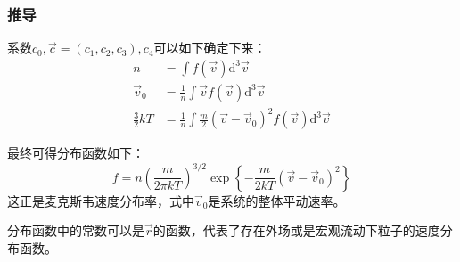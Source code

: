 \documentclass{if-beamer}
\begin{document}
\begin{frame}
    \frametitle{推导}
        \begin{block}{}
            系数$c_0,\vec{c}=(c_1,c_2,c_3),c_4$可以如下确定下来：
            \begin{equation*}
                \begin{aligned}
                n&=\int f(\vec{v}) \mathrm{d}^{3} \vec{v}\\ 
                \vec{v}_{0}&=\frac{1}{n} \int \vec{v} f(\vec{v}) \mathrm{d}^{3} \vec{v}\\ 
                \frac{3}{2} k T&=\frac{1}{n} \int \frac{m}{2}\left(\vec{v}-\vec{v}_{0}\right)^{2} f(\vec{v}) \mathrm{d}^{3} \vec{v}
                \end{aligned}
            \end{equation*}
        \end{block}
        \begin{block}{}
        最终可得分布函数如下：
        \begin{equation*}
            f=n\left(\frac{m}{2 \pi k T}\right)^{3 / 2} \exp \left\{-\frac{m}{2 k T}\left(\vec{v}-\vec{v}_{0}\right)^{2}\right\}
        \end{equation*}
        这正是麦克斯韦速度分布率，式中$\vec{v}_0$是系统的整体平动速率。

        \end{block}
        \begin{block}{}
            分布函数中的常数可以是$\vec{r}$的函数，代表了存在外场或是宏观流动下粒子的速度分布函数。
        \end{block}
    

\end{frame}
\end{document}
